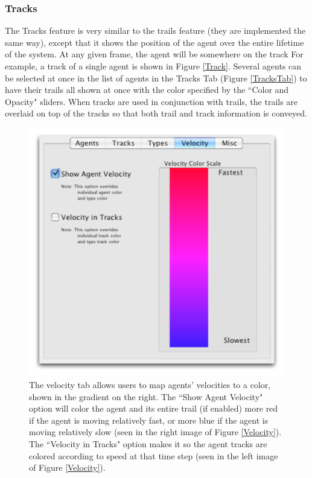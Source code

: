 \documentclass[conference]{IEEEtran}
\begin{document}
\subsubsection{Tracks}

The Tracks feature is very similar to the trails feature
(they are implemented the same way), except that it shows the position of the agent over the entire
lifetime of the system. At any given frame, the agent will be somewhere on the track
For example, a track of a single agent is shown in Figure \ref{Track}.
Several agents can be selected at once in the list of agents in the Tracks Tab (Figure \ref{TracksTab}) to
have their trails all shown at once with the color specified by the ``Color and Opacity" sliders.
When tracks are used in conjunction with trails, the trails are overlaid on top of the tracks so that
both trail and track information is conveyed.





\begin{figure}
\centering
\includegraphics[scale=.5]{images/velocitytab.pdf}
\caption{
The velocity tab allows users to map agents' velocities to a color, shown in the gradient on the right. The ``Show Agent Velocity"
option will color the agent and its entire trail (if enabled) more red if the agent is moving relatively fast, or more blue if the agent
is moving relatively slow (seen in the right image of Figure \ref{Velocity}).
The ``Velocity in Tracks" option makes it so the agent tracks are colored according to speed at that time step (seen in the left
image of Figure \ref{Velocity}).}
\label{VelocityTab}
\end{figure}
\end{document}
